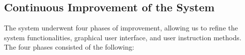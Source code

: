 

\subsection{Continuous Improvement of the System}
The system underwent four phases of improvement, allowing us to refine the system functionalities, graphical user interface, and user instruction methods.
The four phases consisted of the following:

